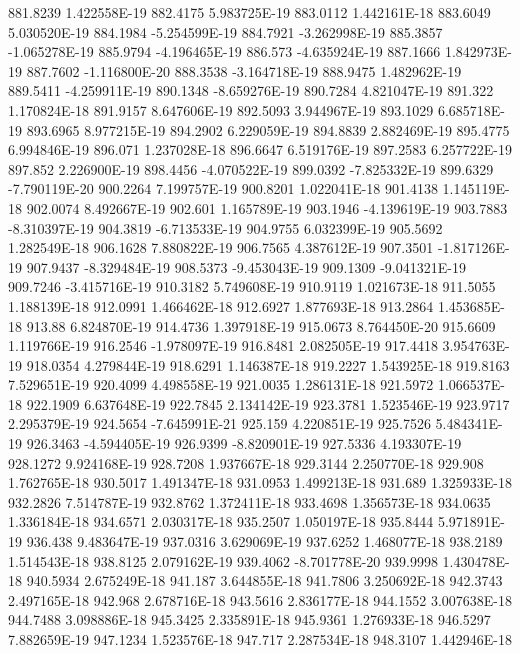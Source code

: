 881.8239  1.422558E-19
882.4175  5.983725E-19
883.0112  1.442161E-18
883.6049  5.030520E-19
884.1984  -5.254599E-19
884.7921  -3.262998E-19
885.3857  -1.065278E-19
885.9794  -4.196465E-19
886.573  -4.635924E-19
887.1666  1.842973E-19
887.7602  -1.116800E-20
888.3538  -3.164718E-19
888.9475  1.482962E-19
889.5411  -4.259911E-19
890.1348  -8.659276E-19
890.7284  4.821047E-19
891.322  1.170824E-18
891.9157  8.647606E-19
892.5093  3.944967E-19
893.1029  6.685718E-19
893.6965  8.977215E-19
894.2902  6.229059E-19
894.8839  2.882469E-19
895.4775  6.994846E-19
896.071  1.237028E-18
896.6647  6.519176E-19
897.2583  6.257722E-19
897.852  2.226900E-19
898.4456  -4.070522E-19
899.0392  -7.825332E-19
899.6329  -7.790119E-20
900.2264  7.199757E-19
900.8201  1.022041E-18
901.4138  1.145119E-18
902.0074  8.492667E-19
902.601  1.165789E-19
903.1946  -4.139619E-19
903.7883  -8.310397E-19
904.3819  -6.713533E-19
904.9755  6.032399E-19
905.5692  1.282549E-18
906.1628  7.880822E-19
906.7565  4.387612E-19
907.3501  -1.817126E-19
907.9437  -8.329484E-19
908.5373  -9.453043E-19
909.1309  -9.041321E-19
909.7246  -3.415716E-19
910.3182  5.749608E-19
910.9119  1.021673E-18
911.5055  1.188139E-18
912.0991  1.466462E-18
912.6927  1.877693E-18
913.2864  1.453685E-18
913.88  6.824870E-19
914.4736  1.397918E-19
915.0673  8.764450E-20
915.6609  1.119766E-19
916.2546  -1.978097E-19
916.8481  2.082505E-19
917.4418  3.954763E-19
918.0354  4.279844E-19
918.6291  1.146387E-18
919.2227  1.543925E-18
919.8163  7.529651E-19
920.4099  4.498558E-19
921.0035  1.286131E-18
921.5972  1.066537E-18
922.1909  6.637648E-19
922.7845  2.134142E-19
923.3781  1.523546E-19
923.9717  2.295379E-19
924.5654  -7.645991E-21
925.159  4.220851E-19
925.7526  5.484341E-19
926.3463  -4.594405E-19
926.9399  -8.820901E-19
927.5336  4.193307E-19
928.1272  9.924168E-19
928.7208  1.937667E-18
929.3144  2.250770E-18
929.908  1.762765E-18
930.5017  1.491347E-18
931.0953  1.499213E-18
931.689  1.325933E-18
932.2826  7.514787E-19
932.8762  1.372411E-18
933.4698  1.356573E-18
934.0635  1.336184E-18
934.6571  2.030317E-18
935.2507  1.050197E-18
935.8444  5.971891E-19
936.438  9.483647E-19
937.0316  3.629069E-19
937.6252  1.468077E-18
938.2189  1.514543E-18
938.8125  2.079162E-19
939.4062  -8.701778E-20
939.9998  1.430478E-18
940.5934  2.675249E-18
941.187  3.644855E-18
941.7806  3.250692E-18
942.3743  2.497165E-18
942.968  2.678716E-18
943.5616  2.836177E-18
944.1552  3.007638E-18
944.7488  3.098886E-18
945.3425  2.335891E-18
945.9361  1.276933E-18
946.5297  7.882659E-19
947.1234  1.523576E-18
947.717  2.287534E-18
948.3107  1.442946E-18
